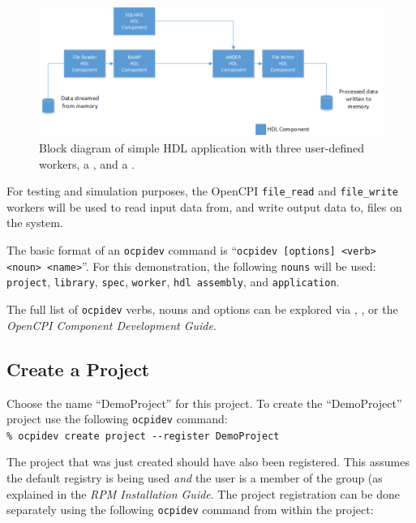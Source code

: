 \begin{figure}[h]
        \centering
        \includegraphics[scale=0.5]{./figures/simple_app_block_diagram.png}
        \caption{Block diagram of simple HDL application with three user-defined workers, a , and a .}
        \label{fig:simple_app_diagram}
\end{figure}
For testing and simulation purposes, the OpenCPI \verb+file_read+ and \verb+file_write+ workers will be used to read input data from, and write output data to, files on the system.\newline

The basic format of an \verb+ocpidev+ command is ``\verb+ocpidev [options] <verb> <noun> <name>+''. For this demonstration, the following \verb+nouns+ will be used: \verb+project+, \verb+library+, \verb+spec+, \verb+worker+, \verb+hdl assembly+, and \verb+application+.\newline

The full list of \verb+ocpidev+ verbs, nouns and options can be explored via , , or the \textit{OpenCPI Component Development Guide}.

\subsection{Create a Project}
Choose the name ``DemoProject'' for this project. To create the ``DemoProject'' project use the following \verb+ocpidev+ command:\\

\forceindent\verb+% ocpidev create project --register DemoProject+\\

The project that was just created should have also been registered. This assumes the default registry is being used \textit{and} the user is a member of the  group (as explained in the \textit{RPM Installation Guide}. The project registration can be done separately using the following \verb+ocpidev+ command from within the project:\\

